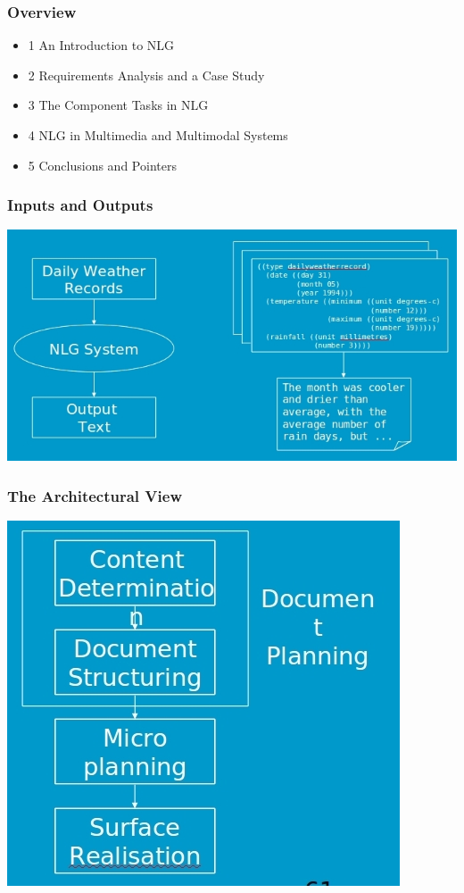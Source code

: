 \documentclass[compress,color=usenames]{beamer}
\begin{document}
\begin{frame}
\frametitle{Overview}

\label{f116}
\begin{itemize}
\item { {1 An Introduction to NLG}}
\item { {2 Requirements Analysis and a Case Study}}
\item { {3 The Component Tasks in NLG}}
\item { {4 NLG in Multimedia and Multimodal Systems}}
\item { {5 Conclusions and Pointers}}
\end{itemize}

 
\end{frame}

\begin{frame}
\frametitle{Inputs and Outputs}

\begin{center}
\includegraphics[scale=.3]{pics/pic6.jpg}
\end{center}

\end{frame}

\begin{frame}
\frametitle{The Architectural View}

\begin{center}
\includegraphics[scale=.3]{pics/pic7.jpg}
\end{center}
 
\end{frame}
\end{document}
